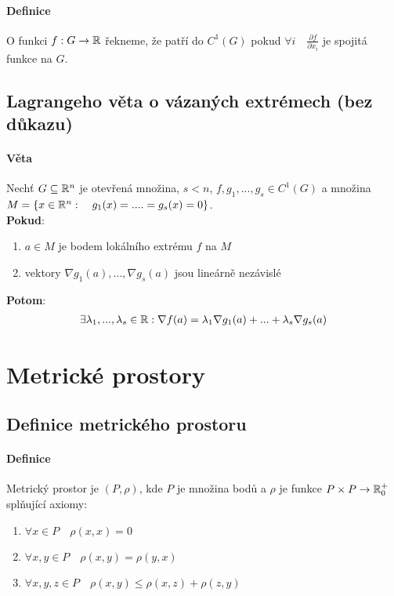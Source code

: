 \documentclass[a4paper,10pt]{article}
\begin{document}
\paragraph{Definice}
O funkci $f: G \to \mathbb{R}$ řekneme, že patří do $C^1(G)$ pokud $\forall i \quad
\frac{\partial f}{\partial x_i}$ je spojitá funkce na $G$.



\subsection{Lagrangeho věta o vázaných extrémech (bez důkazu)}
\setcounter{equation}{0}
\paragraph{Věta}
Nechť $G \subseteq \mathbb{R}^n$ je otevřená množina, $s < n$, $f, g_1, ..., g_s \in
C^1(G)$ a množina $M = \{x \in \mathbb{R}^n: \quad g_1(x) = .... = g_s(x) = 0 \}$. \\
\textbf{Pokud}:
\begin{enumerate}
	\item $a \in M$ je bodem lokálního extrému $f$ na $M$
	\item vektory $\nabla g_1(a), ..., \nabla g_s(a)$ jsou lineárně nezávislé
\end{enumerate}
\textbf{Potom}:
\begin{align*}
	\exists \lambda_1, ..., \lambda_s \in \mathbb{R}: \nabla f(a) = \lambda_1 \nabla g_1
	(a) + ... + \lambda_s \nabla g_s (a)
\end{align*}


\newpage
\section{Metrické prostory}
\setcounter{equation}{0}

\subsection{Definice metrického prostoru}
\setcounter{equation}{0}
\paragraph{Definice}
Metrický prostor je $(P, \rho)$, kde $P$ je množina bodů a $\rho$ je funkce $P \times P
\to \mathbb{R}_0^+$ splňující axiomy:
\begin{enumerate}
	\item $\forall x \in P \quad \rho(x,x) = 0$
	\item $\forall x,y \in P \quad \rho(x,y) = \rho(y,x)$
	\item $\forall x,y,z \in P \quad \rho(x,y) \le \rho(x,z) + \rho(z,y)$
\end{enumerate}
\end{document}
